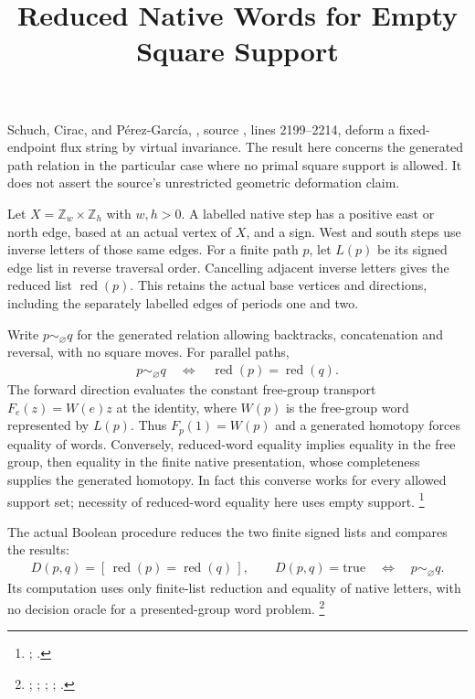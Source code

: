 \documentclass{article}
\title{Reduced Native Words for Empty Square Support}
\author{}
\date{}
\begin{document}
\maketitle
{}

Schuch, Cirac, and P\'erez-Garc\'ia, \cite[Lemma~6.14]{Schuch2010PEPS},
source , lines 2199--2214,
deform a fixed-endpoint flux string by virtual invariance.
The result here concerns the generated path relation in the particular case
where no primal square support is allowed. It does not assert the source's
unrestricted geometric deformation claim.

Let $X=\mathbb Z_w\times\mathbb Z_h$ with $w,h>0$. A labelled native step
has a positive east or north edge, based at an actual vertex of $X$, and
a sign. West and south steps use inverse letters of those same edges.
For a finite path $p$, let $L(p)$ be its signed edge list in reverse traversal
order. Cancelling adjacent inverse letters gives the reduced list
$\operatorname{red}(p)$. This retains the actual base vertices and directions,
including the separately labelled edges of periods one and two.

Write $p\sim_{\varnothing}q$ for the generated relation allowing backtracks,
concatenation and reversal, with no square moves. For parallel paths,
\begin{align}
    p\sim_{\varnothing}q
    \quad\Longleftrightarrow\quad
    \operatorname{red}(p)=\operatorname{red}(q).
    \label{eq:scp10_empty_support_normal_form}
\end{align}
The forward direction evaluates the constant free-group transport
$F_e(z)=W(e)z$ at the identity, where $W(p)$ is the free-group word represented
by $L(p)$. Thus $F_p(1)=W(p)$ and a generated homotopy forces equality of words.
Conversely, reduced-word equality implies equality in the free group,
then equality in the finite native presentation, whose completeness supplies
the generated homotopy. In fact this converse works for every allowed
support set; necessity of reduced-word equality here uses empty support.
\footnote{;
.}

The actual Boolean procedure reduces the two finite signed lists and compares
the results:
\begin{align}
    D(p,q)=[\,\operatorname{red}(p)=\operatorname{red}(q)\,],\qquad
    D(p,q)=\mathrm{true}\quad\Longleftrightarrow\quad p\sim_{\varnothing}q.
    \label{eq:scp10_empty_support_decision}
\end{align}
Its computation uses only finite-list reduction and equality of native letters,
with no decision oracle for a presented-group word problem.
\footnote{;
;
;
;
.}
\end{document}
